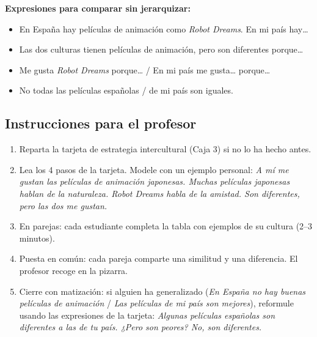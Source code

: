\documentclass[a4paper,11pt]{article}
\begin{document}
\noindent\colorbox{verde!10}{\parbox{\dimexpr\linewidth-2\fboxsep}{%
\textbf{\textcolor{verde}{Expresiones para comparar sin jerarquizar:}}\\[0.3cm]
\begin{itemize}[leftmargin=1cm, itemsep=3pt]
\item En España hay películas de animación como \textit{Robot Dreams}. En mi país hay\ldots
\item Las dos culturas tienen películas de animación, pero son diferentes porque\ldots
\item Me gusta \textit{Robot Dreams} porque\ldots{} / En mi país me gusta\ldots{} porque\ldots
\item No todas las películas españolas / de mi país son iguales.
\end{itemize}
}}

\vspace{0.5cm}

\begin{center}
\end{center}

\vspace{0.5cm}

\subsection*{Instrucciones para el profesor}

\begin{enumerate}[leftmargin=1.5cm, itemsep=4pt]
\item Reparta la tarjeta de estrategia intercultural (Caja 3) si no lo ha hecho antes.
\item Lea los 4 pasos de la tarjeta. Modele con un ejemplo personal: \textit{A mí me gustan las películas de animación japonesas. Muchas películas japonesas hablan de la naturaleza. Robot Dreams habla de la amistad. Son diferentes, pero las dos me gustan.}
\item En parejas: cada estudiante completa la tabla con ejemplos de su cultura (2--3 minutos).
\item Puesta en común: cada pareja comparte una similitud y una diferencia. El profesor recoge en la pizarra.
\item Cierre con matización: si alguien ha generalizado (\textit{En España no hay buenas películas de animación} / \textit{Las películas de mi país son mejores}), reformule usando las expresiones de la tarjeta: \textit{Algunas películas españolas son diferentes a las de tu país. ¿Pero son peores? No, son diferentes.}
\end{enumerate}
\end{document}
